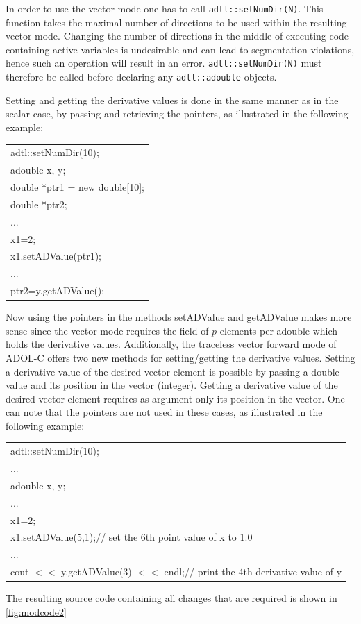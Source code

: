 \documentclass[11pt,twoside]{article}
\begin{document}
In order to use the vector mode one has to call
\verb#adtl::setNumDir(N)#.  This function takes the maximal number of
directions to be used within the resulting vector mode. Changing the
number of directions in the middle of executing code containing active
variables is undesirable and can lead to segmentation violations,
hence such an operation will result in an
error. \verb#adtl::setNumDir(N)# must therefore be called before
declaring any \verb#adtl::adouble# objects.

Setting and getting the derivative values is done in the same manner as in the scalar case, by passing and retrieving the pointers, as illustrated in the following example:
\begin{center}
  \begin{tabular}{l}
    {\sf adtl::setNumDir(10);}\\
    {\sf adouble x, y;}\\
    {\sf double *ptr1 = new double[10];}\\
    {\sf double *ptr2;}\\
      ...\\
    {\sf x1=2;}\\
    {\sf x1.setADValue(ptr1);}\\
    ...\\
    {\sf ptr2=y.getADValue();}
  \end{tabular}
\end{center}
Now using the pointers in the methods {\sf setADValue} and {\sf getADValue} makes more sense since the vector mode requires the field of $p$ elements per {\sf adouble} which holds the derivative values.
Additionally, the traceless vector forward mode of ADOL-C offers two
new methods for setting/getting the derivative values. Setting a derivative value of the desired vector element is possible by passing a {\sf double} value and its position in the vector ({\sf integer}). Getting a derivative value of the desired vector element requires as argument only its position in the vector. One can note that the pointers are not used in these cases, as illustrated in the following example:
\begin{center}
  \begin{tabular}{l}
    {\sf adtl::setNumDir(10);}\\
    ...\\
    {\sf adouble x, y;}\\
    ...\\
    {\sf x1=2;}\\
    {\sf x1.setADValue(5,1);\hspace*{3.7cm}// set the 6th point value of x to 1.0}\\
      ...\\
    {\sf cout $<<$ y.getADValue(3) $<<$ endl;\hspace*{1cm}// print the 4th derivative value of y}
  \end{tabular}
\end{center}
The resulting source code containing all changes that are required is
shown in \autoref{fig:modcode2}
\end{document}
